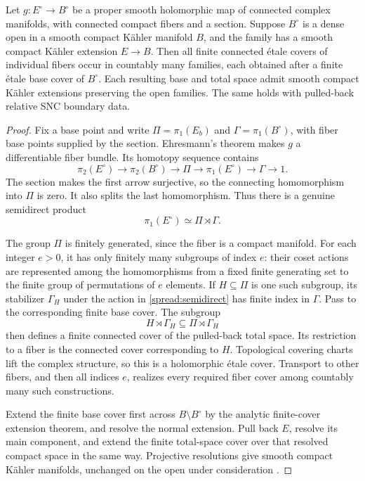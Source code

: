 \begin{lemma}\label{spread:finite-covers}
Let \(g:E^\circ\to B^\circ\) be a proper smooth holomorphic map of
connected complex manifolds, with connected compact fibers and a
section.  Suppose \(B^\circ\) is a dense open in a smooth compact
K\"ahler manifold \(B\), and the family has a smooth compact
K\"ahler extension \(E\to B\).
Then all finite connected \'etale covers of individual fibers occur
in countably many families, each obtained after a finite \'etale base
cover of \(B^\circ\).  Each resulting base and total space admit
smooth compact K\"ahler extensions preserving the open families.
The same holds with pulled-back relative SNC boundary data.
\end{lemma}

\begin{proof}
Fix a base point and write \(\Pi=\pi_1(E_b)\) and
\(\Gamma=\pi_1(B^\circ)\), with fiber base points supplied by the
section.  Ehresmann's theorem makes \(g\) a differentiable fiber
bundle.  Its homotopy sequence contains
\[
 \pi_2(E^\circ)\longrightarrow\pi_2(B^\circ)
 \longrightarrow\Pi\longrightarrow\pi_1(E^\circ)
 \longrightarrow\Gamma\longrightarrow1.
\]
The section makes the first arrow surjective, so the connecting
homomorphism into \(\Pi\) is zero.  It also splits the last
homomorphism.  Thus there is a genuine semidirect product
\begin{equation}\label{spread:semidirect}
 \pi_1(E^\circ)\simeq\Pi\rtimes\Gamma.
\end{equation}

The group \(\Pi\) is finitely generated, since the fiber is a compact
manifold.  For each integer \(e>0\), it has only finitely many
subgroups of index \(e\): their coset actions are represented among
the homomorphisms from a fixed finite generating set to the finite
group of permutations of \(e\) elements.  If \(H\subseteq\Pi\) is
one such subgroup, its stabilizer \(\Gamma_H\) under the action in
\eqref{spread:semidirect} has finite index in \(\Gamma\).
Pass to the corresponding finite base cover.  The subgroup
\[
 H\rtimes\Gamma_H\subseteq\Pi\rtimes\Gamma_H
\]
then defines a finite connected cover of the pulled-back total
space.  Its restriction to a fiber is the connected cover
corresponding to \(H\).  Topological covering charts lift the complex
structure, so this is a holomorphic \'etale cover.  Transport to
other fibers, and then all indices \(e\), realizes every required
fiber cover among countably many such constructions.

Extend the finite base cover first across \(B\setminus B^\circ\)
by the analytic finite-cover extension theorem, and resolve the
normal extension.  Pull back \(E\), resolve its main component, and
extend the finite total-space cover over that resolved compact
space in the same way.  Projective resolutions give smooth compact
K\"ahler manifolds, unchanged on the open under consideration
\cite[Lemma~2.21]{Villadsen24}.


\end{proof}
